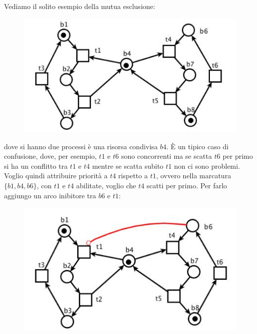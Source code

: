 \documentclass[a4paper,12pt, oneside]{book}
\begin{document}
\begin{esempio}
  Vediamo il solito esempio della mutua esclusione:
  \begin{figure}[H]
    \centering
    \includegraphics[scale = 0.6]{img/inib3.jpg}
  \end{figure}
  dove si hanno due processi è una risorsa condivisa $b4$. È un tipico caso di
  confusione, dove, per esempio, $t1$ e $t6$ sono concorrenti ma se scatta $t6$
  per primo si ha un conflitto tra $t1$ e $t4$ mentre se scatta subito $t1$ non
  ci sono problemi.\\
  Voglio quindi attribuire priorità a $t4$ rispetto a $t1$, ovvero nella
  marcatura $\{b1,b4,b6\}$, con $t1$ e $t4$ abilitate, voglio che $t4$ scatti
  per primo. Per farlo aggiungo un arco inibitore tra $b6$ e $t1$:
  \begin{figure}[H]
    \centering
    \includegraphics[scale = 0.6]{img/inib5.jpg}
  \end{figure}
  

\end{esempio}
\end{document}
